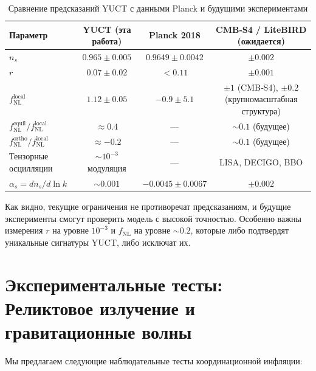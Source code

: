 \documentclass[12pt,a4paper]{article}
\theoremstyle{remark}
\newcommand{\rs}{r}
\begin{document}
	\begin{table}[htbp]
		\centering
		\caption{Сравнение предсказаний YUCT с данными Planck и будущими экспериментами}
		\label{tab:comparison}
		\begin{tabular}{lccc}
			\toprule
			\textbf{Параметр} & \textbf{YUCT (эта работа)} & \textbf{Planck 2018} & \textbf{CMB‑S4 / LiteBIRD (ожидается)} \\
			\midrule
			$n_s$ & $0.965 \pm 0.005$ & $0.9649 \pm 0.0042$ & $\pm 0.002$ \\
			$\rs$ & $0.07 \pm 0.02$ & $<0.11$ & $\pm 0.001$ \\
			$f_{\mathrm{NL}}^{\mathrm{local}}$ & $1.12 \pm 0.05$ & $-0.9 \pm 5.1$ & $\pm 1$ (CMB‑S4), $\pm 0.2$ (крупномасштабная структура) \\
			$f_{\mathrm{NL}}^{\mathrm{equil}} / f_{\mathrm{NL}}^{\mathrm{local}}$ & $\approx 0.4$ & — & $\sim 0.1$ (будущее) \\
			$f_{\mathrm{NL}}^{\mathrm{ortho}} / f_{\mathrm{NL}}^{\mathrm{local}}$ & $\approx -0.2$ & — & $\sim 0.1$ (будущее) \\
			Тензорные осцилляции & $\sim 10^{-3}$ модуляция & — & LISA, DECIGO, BBO \\
			$\alpha_s = dn_s/d\ln k$ & $\sim 0.001$ & $-0.0045 \pm 0.0067$ & $\pm 0.002$ \\
			\bottomrule
		\end{tabular}
	\end{table}
	
	Как видно, текущие ограничения не противоречат предсказаниям, и будущие эксперименты смогут проверить модель с высокой точностью. Особенно важны измерения $r$ на уровне $10^{-3}$ и $f_{\text{NL}}$ на уровне $\sim 0.2$, которые либо подтвердят уникальные сигнатуры YUCT, либо исключат их.
	
	\section{Экспериментальные тесты: Реликтовое излучение и гравитационные волны}
	\label{sec:tests}
	
	Мы предлагаем следующие наблюдательные тесты координационной инфляции:
	
\end{document}
